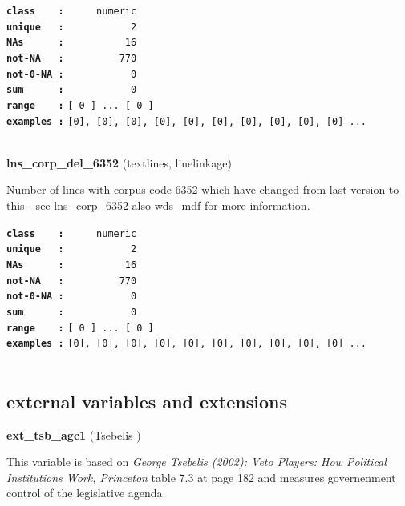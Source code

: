 \documentclass[]{article}
\begin{document}
\textbf{\texttt{class\ \ \ \ :}} \texttt{~~~~~numeric}\\
\textbf{\texttt{unique\ \ \ :}} \texttt{~~~~~~~~~~~2}\\
\textbf{\texttt{NAs\ \ \ \ \ \ :}} \texttt{~~~~~~~~~~16}\\
\textbf{\texttt{not-NA\ \ \ :}} \texttt{~~~~~~~~~770}\\
\textbf{\texttt{not-0-NA\ :}} \texttt{~~~~~~~~~~~0}\\
\textbf{\texttt{sum\ \ \ \ \ \ :}} \texttt{~~~~~~~~~~~0}\\
\textbf{\texttt{range\ \ \ \ :}}
\texttt{{[}\ 0\ {]}\ ...\ {[}\ 0\ {]}}\\
\textbf{\texttt{examples\ :}}
\texttt{{[}0{]},\ {[}0{]},\ {[}0{]},\ {[}0{]},\ {[}0{]},\ {[}0{]},\ {[}0{]},\ {[}0{]},\ {[}0{]},\ {[}0{]}\ ...}\\

~

\textbf{lns\_corp\_del\_6352} (textlines, linelinkage)

Number of lines with corpus code 6352 which have changed from last
version to this - see lns\_corp\_6352 also wds\_mdf for more
information.

\textbf{\texttt{class\ \ \ \ :}} \texttt{~~~~~numeric}\\
\textbf{\texttt{unique\ \ \ :}} \texttt{~~~~~~~~~~~2}\\
\textbf{\texttt{NAs\ \ \ \ \ \ :}} \texttt{~~~~~~~~~~16}\\
\textbf{\texttt{not-NA\ \ \ :}} \texttt{~~~~~~~~~770}\\
\textbf{\texttt{not-0-NA\ :}} \texttt{~~~~~~~~~~~0}\\
\textbf{\texttt{sum\ \ \ \ \ \ :}} \texttt{~~~~~~~~~~~0}\\
\textbf{\texttt{range\ \ \ \ :}}
\texttt{{[}\ 0\ {]}\ ...\ {[}\ 0\ {]}}\\
\textbf{\texttt{examples\ :}}
\texttt{{[}0{]},\ {[}0{]},\ {[}0{]},\ {[}0{]},\ {[}0{]},\ {[}0{]},\ {[}0{]},\ {[}0{]},\ {[}0{]},\ {[}0{]}\ ...}\\

~

\subsection{external variables and
extensions}\label{external-variables-and-extensions}

\textbf{ext\_tsb\_agc1} (Tsebelis )

This variable is based on \emph{George Tsebelis (2002): Veto Players:
How Political Institutions Work, Princeton} table 7.3 at page 182 and
measures governenment control of the legislative agenda.
\end{document}

